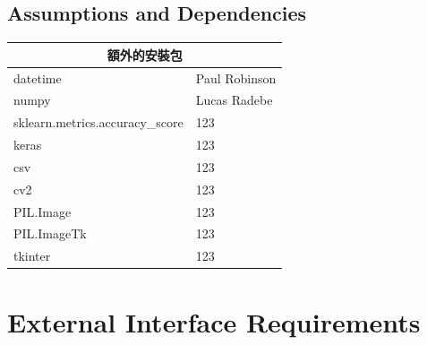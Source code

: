 \documentclass{scrreprt}
\begin{document}
\begin{CJK}{UTF8}{bkai}
\section{Assumptions and Dependencies}
\begin{tabular}{ |l|l| }
    \hline
    \multicolumn{2}{|c|}{額外的安裝包} \\
    \hline
    datetime & Paul Robinson \\
    \hline
    numpy & Lucas Radebe \\
    \hline
    sklearn.metrics.accuracy_score & 123 \\
    \hline
    keras & 123 \\
    \hline
    csv & 123 \\
    \hline
    cv2 & 123 \\
    \hline
    PIL.Image & 123 \\
    \hline
    PIL.ImageTk & 123 \\
    \hline
    tkinter & 123 \\
    \hline
\end{tabular}

\chapter{External Interface Requirements}


\end{CJK}
\end{document}
